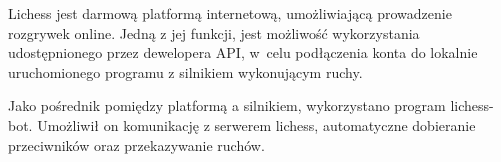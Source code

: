 
Lichess jest darmową platformą internetową, umożliwiającą prowadzenie rozgrywek online.
Jedną z jej funkcji, jest możliwość wykorzystania udostępnionego przez dewelopera API, w~celu podłączenia konta do lokalnie uruchomionego programu z silnikiem wykonującym ruchy.

Jako pośrednik pomiędzy platformą a silnikiem, wykorzystano program lichess-bot.
Umożliwił on komunikację z serwerem lichess, automatyczne dobieranie przeciwników oraz przekazywanie ruchów.